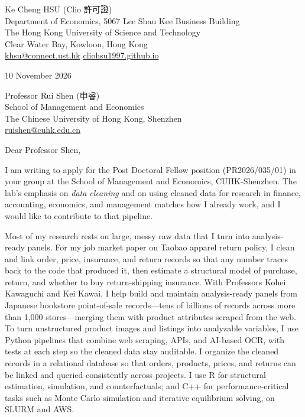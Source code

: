 \documentclass[11pt,letterpaper]{article}
\begin{document}
\begin{flushright}
Ke Cheng HSU (Clio 許可證)\\
Department of Economics, 5067 Lee Shau Kee Business Building\\
The Hong Kong University of Science and Technology\\
Clear Water Bay, Kowloon, Hong Kong\\
\href{mailto:khsu@connect.ust.hk}{khsu@connect.ust.hk} \quad \href{https://cliohsu1997.github.io}{cliohsu1997.github.io}
\end{flushright}

\vspace{0.5em}

10 November 2026

\vspace{0.5em}

Professor Rui Shen (申睿)\\
School of Management and Economics\\
The Chinese University of Hong Kong, Shenzhen\\
\href{mailto:ruishen@cuhk.edu.cn}{ruishen@cuhk.edu.cn}

\vspace{0.5em}

Dear Professor Shen,

I am writing to apply for the Post Doctoral Fellow position (PR2026/035/01) in your group at the School of Management and Economics, CUHK-Shenzhen. The lab's emphasis on \textit{data cleaning} and on using cleaned data for research in finance, accounting, economics, and management matches how I already work, and I would like to contribute to that pipeline.

Most of my research rests on large, messy raw data that I turn into analysis-ready panels. For my job market paper on Taobao apparel return policy, I clean and link order, price, insurance, and return records so that any number traces back to the code that produced it, then estimate a structural model of purchase, return, and whether to buy return-shipping insurance. With Professors Kohei Kawaguchi and Kei Kawai, I help build and maintain analysis-ready panels from Japanese bookstore point-of-sale records---tens of billions of records across more than 1{,}000 stores---merging them with product attributes scraped from the web. To turn unstructured product images and listings into analyzable variables, I use Python pipelines that combine web scraping, APIs, and AI-based OCR, with tests at each step so the cleaned data stay auditable. I organize the cleaned records in a relational database so that orders, products, prices, and returns can be linked and queried consistently across projects. I use R for structural estimation, simulation, and counterfactuals; and C++ for performance-critical tasks such as Monte Carlo simulation and iterative equilibrium solving, on SLURM and AWS.
\end{document}
